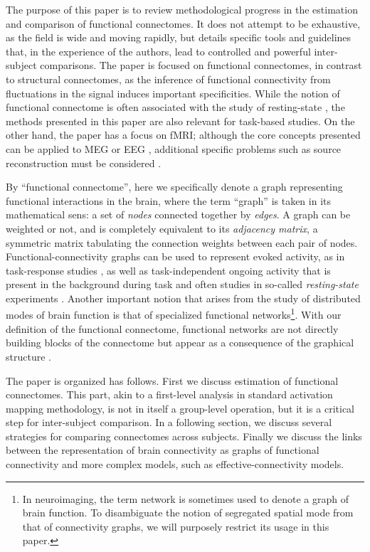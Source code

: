 \documentclass[5p]{elsarticle}
\begin{document}
The purpose of this paper is to review methodological progress in the
estimation and comparison of functional connectomes. It does not attempt
to be exhaustive, as the field is wide and moving rapidly, but details
specific tools and guidelines that, in the experience of the authors,
lead to controlled and powerful inter-subject comparisons. The paper is
focused on functional connectomes, in contrast to structural connectomes,
as the inference of functional connectivity from fluctuations in the
signal induces important specificities. While the notion of functional
connectome is often associated with the study of resting-state
\cite{biswal2010}, the methods presented in this paper are also relevant
for task-based studies. On the other hand, the paper has a focus on fMRI;
although the core concepts presented can be applied to MEG or EEG
\cite{stam2004}, additional specific problems such as source
reconstruction must be considered \cite{schoffelen2009}.

By ``functional connectome'', here we specifically denote a graph
representing functional interactions in the brain, where the term
``graph'' is taken in its mathematical sens: a set of \emph{nodes}
connected together by \emph{edges}. A graph can be weighted or not, and
is completely equivalent to its \emph{adjacency matrix}, a symmetric
matrix tabulating the connection weights between each pair of nodes.
Functional-connectivity graphs can be used to represent evoked activity,
as in task-response studies \cite{mcintosh2000}, as well as
task-independent ongoing activity that is present in the background
during task and often studies in so-called \emph{resting-state}
experiments \cite{raichle2010}. Another important notion that arises from
the study of distributed modes of brain function is that of specialized
functional networks\footnote{In neuroimaging, the term network is
sometimes used to denote a graph of brain function. To disambiguate the
notion of segregated spatial mode \cite{fox2005} from that of
connectivity graphs, we will purposely restrict its usage in this
paper.}. With our definition of the functional connectome, functional
networks are not directly building blocks of the connectome but appear
as a consequence of the graphical structure
\cite{varoquaux2010c,varoquaux2012}.

The paper is organized has follows. First we discuss estimation of
functional connectomes. This part, akin to a first-level analysis in
standard activation mapping methodology, is not in itself a group-level
operation, but it is a critical step for inter-subject comparison.
In a following section, we discuss several strategies for comparing
connectomes across subjects. Finally we discuss the links between the
representation of brain connectivity as graphs of functional connectivity
and more complex models, such as effective-connectivity models.
\end{document}
